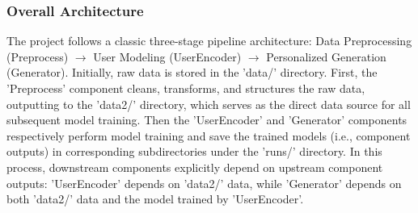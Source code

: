 \documentclass[10pt,a4paper]{article}
\begin{document}
\subsubsection{Overall Architecture}
The project follows a classic three-stage pipeline architecture: Data Preprocessing (Preprocess) $\rightarrow$ User Modeling (UserEncoder) $\rightarrow$ Personalized Generation (Generator). Initially, raw data is stored in the 'data/' directory. First, the 'Preprocess' component cleans, transforms, and structures the raw data, outputting to the 'data2/' directory, which serves as the direct data source for all subsequent model training. Then the 'UserEncoder' and 'Generator' components respectively perform model training and save the trained models (i.e., component outputs) in corresponding subdirectories under the 'runs/' directory. In this process, downstream components explicitly depend on upstream component outputs: 'UserEncoder' depends on 'data2/' data, while 'Generator' depends on both 'data2/' data and the model trained by 'UserEncoder'.
\end{document}
